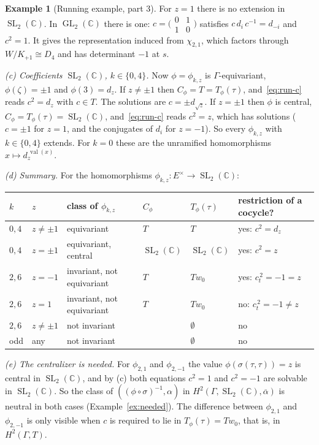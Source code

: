 \documentclass[12pt,letterpaper]{article}
\numberwithin{equation}{section}
\theoremstyle{plain}
\theoremstyle{definition}
\newtheorem{example}[theorem]{Example}
\newcommand{\C}{\mathbb{C}}
\newcommand{\pmat}[4]{\bigl(\begin{smallmatrix}#1&#2\\#3&#4\end{smallmatrix}\bigr)}
\DeclareMathOperator{\GL}{GL}
\DeclareMathOperator{\SL}{SL}
\DeclareMathOperator{\val}{val}
\begin{document}
\begin{example}[Running example, part 3]
For $z=1$ there is no extension in $\SL_2(\C)$. In $\GL_2(\C)$ there is
one: $c=\pmat{0}{1}{1}{0}$ satisfies $c\,d_i\,c^{-1}=d_{-i}$ and $c^2=1$.
It gives the representation induced from $\chi_{2,1}$, which factors
through $W/K_{+1}\cong D_4$ and has determinant $-1$ at $s$.

\smallskip\noindent\emph{(c) Coefficients $\SL_2(\C)$, $k\in\{0,4\}$.}
Now $\phi=\phi_{k,z}$ is $\Gamma$-equivariant, $\phi(\zeta)=\pm1$ and
$\phi(3)=d_z$. If $z\neq\pm1$ then $C_\phi=T=T_\phi(\tau)$,
and~\eqref{eq:run-c} reads $c^2=d_z$ with $c\in T$. The solutions are
$c=\pm d_{\sqrt z}$. If $z=\pm1$ then $\phi$ is central,
$C_\phi=T_\phi(\tau)=\SL_2(\C)$, and~\eqref{eq:run-c} reads $c^2=z$,
which has solutions ($c=\pm1$ for $z=1$, and the conjugates of $d_i$ for
$z=-1$). So every $\phi_{k,z}$ with $k\in\{0,4\}$ extends. For $k=0$ these
are the unramified homomorphisms $x\mapsto d_z^{\,\val(x)}$.

\smallskip\noindent\emph{(d) Summary.} For the homomorphisms
$\phi_{k,z}:E^\times\to\SL_2(\C)$:
\begin{center}
\begin{tabular}{@{}llllll@{}}
\toprule
$k$ & $z$ & class of $\phi_{k,z}$ & $C_\phi$ & $T_\phi(\tau)$ &
restriction of a cocycle? \\
\midrule
$0,4$ & $z\neq\pm1$ & equivariant & $T$ & $T$ & yes: $c^2=d_z$ \\
$0,4$ & $z=\pm1$ & equivariant, central & $\SL_2(\C)$ & $\SL_2(\C)$ &
yes: $c^2=z$ \\
$2,6$ & $z=-1$ & invariant, not equivariant & $T$ & $Tw_0$ &
yes: $c_t^{\,2}=-1=z$ \\
$2,6$ & $z=1$ & invariant, not equivariant & $T$ & $Tw_0$ &
no: $c_t^{\,2}=-1\neq z$ \\
$2,6$ & $z\neq\pm1$ & not invariant & & $\emptyset$ & no \\
odd & any & not invariant & & $\emptyset$ & no \\
\bottomrule
\end{tabular}
\end{center}

\smallskip\noindent\emph{(e) The centralizer is needed.} For
$\phi_{2,1}$ and $\phi_{2,-1}$ the value $\phi(\sigma(\tau,\tau))=z$ is
central in $\SL_2(\C)$, and by (c) both equations $c^2=1$ and $c^2=-1$
are solvable in $\SL_2(\C)$. So the class of
$((\phi\circ\sigma)^{-1},\alpha)$ in
$H^2(\Gamma,\SL_2(\C),\overline{\alpha})$ is neutral in both cases
(Example~\ref{ex:needed}). The difference between $\phi_{2,1}$ and
$\phi_{2,-1}$ is only visible when $c$ is required to lie in
$T_\phi(\tau)=Tw_0$, that is, in $H^2(\Gamma,T)$.
\end{example}
\end{document}
